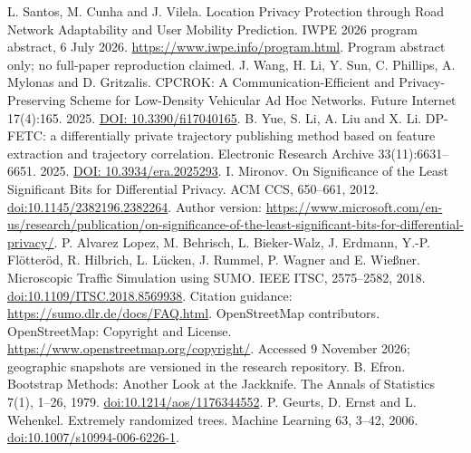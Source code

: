  L. Santos, M. Cunha and J. Vilela. Location Privacy Protection through Road Network Adaptability and User Mobility Prediction. IWPE 2026 program abstract, 6 July 2026. \url{https://www.iwpe.info/program.html}. Program abstract only; no full-paper reproduction claimed.
 J. Wang, H. Li, Y. Sun, C. Phillips, A. Mylonas and D. Gritzalis. CPCROK: A Communication-Efficient and Privacy-Preserving Scheme for Low-Density Vehicular Ad Hoc Networks. Future Internet 17(4):165. 2025. \href{https://uhra.herts.ac.uk/id/eprint/25705/}{DOI: 10.3390/fi17040165}.
 B. Yue, S. Li, A. Liu and X. Li. DP-FETC: a differentially private trajectory publishing method based on feature extraction and trajectory correlation. Electronic Research Archive 33(11):6631--6651. 2025. \href{https://www.aimspress.com/article/doi/10.3934/era.2025293}{DOI: 10.3934/era.2025293}.
 I. Mironov. On Significance of the Least Significant Bits for Differential Privacy. ACM CCS, 650--661, 2012. \href{https://doi.org/10.1145/2382196.2382264}{doi:10.1145/2382196.2382264}. Author version: \url{https://www.microsoft.com/en-us/research/publication/on-significance-of-the-least-significant-bits-for-differential-privacy/}.
 P. Alvarez Lopez, M. Behrisch, L. Bieker-Walz, J. Erdmann, Y.-P. Flötteröd, R. Hilbrich, L. Lücken, J. Rummel, P. Wagner and E. Wießner. Microscopic Traffic Simulation using SUMO. IEEE ITSC, 2575--2582, 2018. \href{https://doi.org/10.1109/ITSC.2018.8569938}{doi:10.1109/ITSC.2018.8569938}. Citation guidance: \url{https://sumo.dlr.de/docs/FAQ.html}.
 OpenStreetMap contributors. OpenStreetMap: Copyright and License. \url{https://www.openstreetmap.org/copyright/}. Accessed 9 November 2026; geographic snapshots are versioned in the research repository.
 B. Efron. Bootstrap Methods: Another Look at the Jackknife. The Annals of Statistics 7(1), 1--26, 1979. \href{https://doi.org/10.1214/aos/1176344552}{doi:10.1214/aos/1176344552}.
 P. Geurts, D. Ernst and L. Wehenkel. Extremely randomized trees. Machine Learning 63, 3--42, 2006. \href{https://doi.org/10.1007/s10994-006-6226-1}{doi:10.1007/s10994-006-6226-1}.
